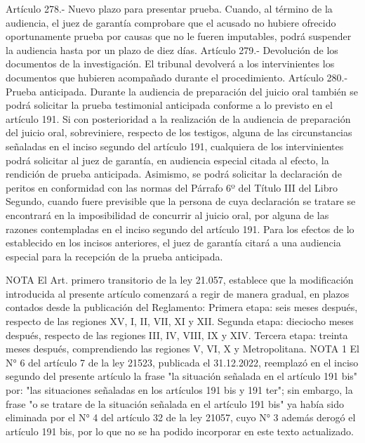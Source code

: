     Artículo 278.- Nuevo plazo para presentar prueba. Cuando, al término de la audiencia, el juez de garantía comprobare que el acusado no hubiere ofrecido oportunamente prueba por causas que no le fueren imputables, podrá suspender la audiencia hasta por un plazo de diez días.
    Artículo 279.- Devolución de los documentos de la investigación. El tribunal devolverá a los intervinientes los documentos que hubieren acompañado durante el procedimiento.
    Artículo 280.- Prueba anticipada. Durante la audiencia de preparación del juicio oral también se podrá solicitar la prueba testimonial anticipada conforme a lo previsto en el artículo 191.
    Si con posterioridad a la realización de la audiencia de preparación del juicio oral, sobreviniere, respecto de los testigos, alguna de las circunstancias señaladas en el inciso segundo del artículo 191, cualquiera de los intervinientes podrá solicitar al juez de garantía, en audiencia especial citada al efecto, la rendición de prueba anticipada.
    Asimismo, se podrá solicitar la declaración de peritos en conformidad con las normas del Párrafo 6º del Título III del Libro Segundo, cuando fuere previsible que la persona de cuya declaración se tratare se encontrará en la imposibilidad de concurrir al juicio oral, por alguna de las razones contempladas en el inciso segundo del artículo 191.
    Para los efectos de lo establecido en los incisos anteriores, el juez de garantía citará a una audiencia especial para la recepción de la prueba anticipada.





NOTA
      El Art. primero transitorio de la ley 21.057, establece que la modificación introducida al presente artículo comenzará a regir de manera gradual, en plazos contados desde la publicación del Reglamento: Primera etapa: seis meses después, respecto de las regiones XV, I, II, VII, XI y XII.  Segunda etapa: dieciocho meses después, respecto de las regiones III, IV, VIII, IX y XIV. Tercera etapa:  treinta meses después, comprendiendo las regiones V, VI, X y Metropolitana.
NOTA 1
      El N° 6 del artículo 7 de la ley 21523, publicada el 31.12.2022, reemplazó en el inciso segundo del presente artículo la frase "la situación señalada en el artículo 191 bis" por: "las situaciones señaladas en los artículos 191 bis y 191 ter"; sin embargo, la frase "o se tratare de la situación señalada en el artículo 191 bis" ya había sido eliminada por el N° 4 del artículo 32 de la ley 21057, cuyo N° 3 además derogó el artículo 191 bis, por lo que no se ha podido incorporar en este texto actualizado.

